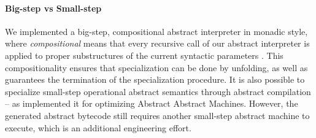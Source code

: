\paragraph{Big-step vs Small-step}

We implemented a big-step, compositional abstract interpreter in monadic
style, where \textit{compositional} means that every recursive call of our abstract
interpreter is applied to proper substructures of the current syntactic
parameters \cite{10.1007/3-540-61580-6_11}. This compositionality ensures that
specialization can be done by unfolding, as well as guarantees the termination
of the specialization procedure. It is also possible to specialize small-step
operational abstract semantics through abstract compilation
\cite{Boucher:1996:ACN:647473.727587} -- as
\citet{Johnson:2013:OAA:2500365.2500604} implemented it for
optimizing Abstract Abstract Machines. However, the generated abstract
bytecode still requires another small-step abstract machine to execute, which is
an additional engineering effort.
